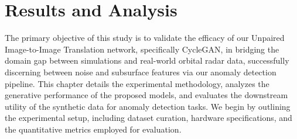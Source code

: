 \chapter{Results and Analysis}
\label{cha:results}

The primary objective of this study is to validate the efficacy of our Unpaired Image-to-Image Translation network, specifically CycleGAN, in bridging the domain gap between simulations and real-world orbital radar data, successfully discerning between noise and subsurface features via our anomaly detection pipeline.
This chapter details the experimental methodology, analyzes the generative performance of the proposed models, and evaluates the downstream utility of the synthetic data for anomaly detection tasks.
We begin by outlining the experimental setup, including dataset curation, hardware specifications, and the quantitative metrics employed for evaluation.





